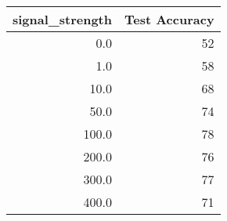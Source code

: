 \begin{tabular}{rr}
\toprule
 signal\_strength &  Test Accuracy \\
\midrule
             0.0 &             52 \\
             1.0 &             58 \\
            10.0 &             68 \\
            50.0 &             74 \\
           100.0 &             78 \\
           200.0 &             76 \\
           300.0 &             77 \\
           400.0 &             71 \\
\bottomrule
\end{tabular}

